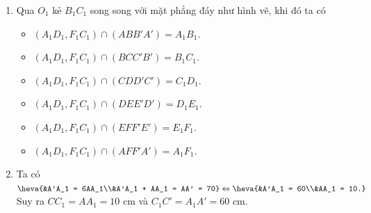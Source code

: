 \begin{bt}
{\begin{center}
		\end{center}
		\begin{enumerate}
			\item Qua $O_1$ kẻ $B_1C_1$ song song với mặt phẳng đáy như hình vẽ, khi đó ta có
			\begin{itemize}
				\item $\left(A_1D_1,F_1C_1\right)\cap\left(ABB'A'\right) = A_1B_1$.
				\item $\left(A_1D_1,F_1C_1\right)\cap\left(BCC'B'\right) = B_1C_1$.
				\item $\left(A_1D_1,F_1C_1\right)\cap\left(CDD'C'\right) = C_1D_1$.
				\item $\left(A_1D_1,F_1C_1\right)\cap\left(DEE'D'\right) = D_1E_1$.
				\item $\left(A_1D_1,F_1C_1\right)\cap\left(EFF'E'\right) = E_1F_1$.
				\item $\left(A_1D_1,F_1C_1\right)\cap\left(AFF'A'\right) = A_1F_1$.
			\end{itemize}
			\item Ta có $\heva{&A'A_1 = 6AA_1\\&A'A_1 + AA_1 = AA' = 70} \Leftrightarrow\heva{&A'A_1 = 60\\&AA_1 = 10.}$\\
			Suy ra $CC_1 = AA_1 = 10$ cm và $C_1C' = A_1A' = 60$ cm.
		\end{enumerate}
	}
\end{bt}

